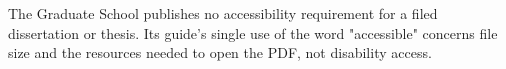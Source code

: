
\thesissetchapteropening{2in}

	{The Graduate School publishes no accessibility requirement for a filed
	 dissertation or thesis. Its guide's single use of the word "accessible"
	 concerns file size and the resources needed to open the PDF, not disability
	 access.}

